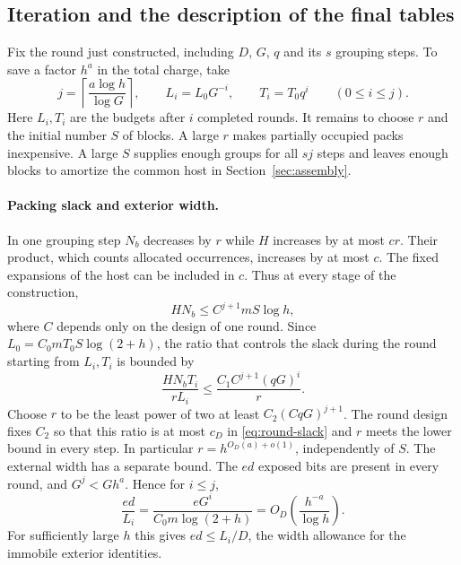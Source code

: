 \subsection{Iteration and the description of the final tables}
\label{iter:subsection}

Fix the round just constructed, including $D$, $G$, $q$ and its $s$
grouping steps. To save a factor $h^a$ in the total charge, take
\[
 j=\left\lceil\frac{a\log h}{\log G}\right\rceil,\qquad
 L_i=L_0G^{-i},\qquad T_i=T_0q^i \qquad(0\le i\le j).
\]
Here $L_i,T_i$ are the budgets after $i$ completed rounds.
It remains to choose $r$ and the initial number $S$ of blocks. A large
$r$ makes partially occupied packs inexpensive. A large $S$ supplies
enough groups for all $sj$ steps and leaves enough blocks to amortize
the common host in Section~\ref{sec:assembly}.

\paragraph{Packing slack and exterior width.}
In one grouping step $N_b$ decreases by $r$ while $H$ increases by at
most $cr$. Their product, which counts allocated occurrences, increases
by at most $c$. The fixed expansions of the host can be included in $c$.
Thus at every stage of the construction,
\begin{equation}
 H N_b\le C^{j+1}mS\log h , \label{iter:occurrences}
\end{equation}
where $C$ depends only on the design of one round. Since
$L_0=C_0 mT_0 S\log(2+h)$, the ratio that controls the slack during
the round starting from $L_i,T_i$ is bounded by
\[
   \frac{H N_b T_i}{rL_i}\le \frac{C_1C^{j+1}(qG)^i}{r}.
\]
Choose $r$ to be the least power of two at least $C_2(CqG)^{j+1}$.
The round design fixes $C_2$ so that this ratio is at most $c_D$ in
\eqref{eq:round-slack} and $r$ meets the lower bound in every step.
In particular $r=h^{O_D(a)+o(1)}$, independently of $S$. The external
width has a separate bound. The $ed$ exposed bits are present in every
round, and $G^j<Gh^a$. Hence for $i\le j$,
\[
       \frac{ed}{L_i}=\frac{eG^i}{C_0m\log(2+h)}
           =O_D\!\left(\frac{h^{-a}}{\log h}\right).
\]
For sufficiently large $h$ this gives $ed\le L_i/D$, the width
allowance for the immobile exterior identities.


